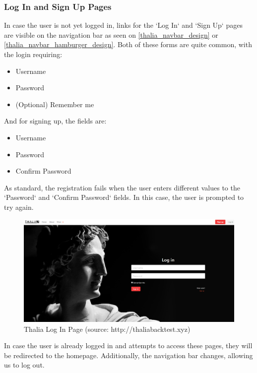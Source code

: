 \documentclass[main.tex]{subfiles}
\begin{document}
\subsubsection*{Log In and Sign Up Pages}

In case the user is not yet logged in, links for the `Log In` and `Sign Up` pages are visible on the navigation bar as seen on \figurename{\ref{thalia_navbar_design}} or \figurename{\ref{thalia_navbar_hamburger_design}}.
Both of these forms are quite common, with the login requiring:

\begin{itemize}
    \item Username
    \item Password
    \item (Optional) Remember me
\end{itemize}

And for signing up, the fields are:

\begin{itemize}
    \item Username
    \item Password
    \item Confirm Password
\end{itemize}

As standard, the registration fails when the user enters different values to the `Password` and `Confirm Password` fields. In this case, the user is prompted to try again.

\begin{figure}[H]
   \centering
   \includegraphics[width=\textwidth]{08Appendices/081User/081Pictures/login.png}
   \caption{Thalia Log In Page (source: http://thaliabacktest.xyz)}
   \label{thalia_login_design}
\end{figure}

In case the user is already logged in and attempts to access these pages, they will be redirected to the homepage. Additionally, the navigation bar changes, allowing us to log out.
\end{document}
